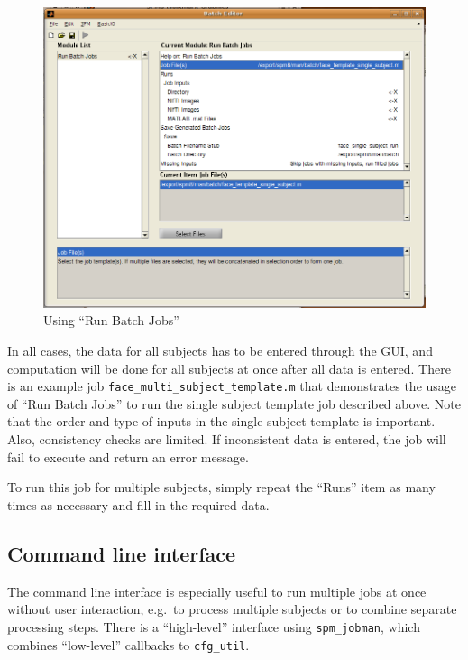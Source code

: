 \begin{figure}[htbp]
  \centering
  \includegraphics[width=.9\linewidth]{batch/batch_multi_subject_template}

  \caption{Using ``Run Batch Jobs''}
  \label{fig:batch_multi_subject_template}
\end{figure}

In all cases, the data for all subjects has to be entered through the
GUI, and computation will be done for all subjects at once after all
data is entered. There is an example job
\verb|face_multi_subject_template.m| that demonstrates the usage of
``Run Batch Jobs'' to run the single subject template job described
above. Note that the order and type of inputs in the single subject
template is important. Also, consistency checks are limited. If
inconsistent data is entered, the job will fail to execute and return
an error message.

To run this job for multiple subjects, simply repeat the ``Runs'' item
as many times as necessary and fill in the required data.

\subsection{Command line interface}
\label{sec:batch_interface_cmd}

The command line interface is especially useful to run multiple jobs
at once without user interaction, e.g.\ to process multiple subjects
or to combine separate processing steps. There is a ``high-level''
interface using \verb|spm_jobman|, which combines ``low-level''
callbacks to \verb|cfg_util|.

